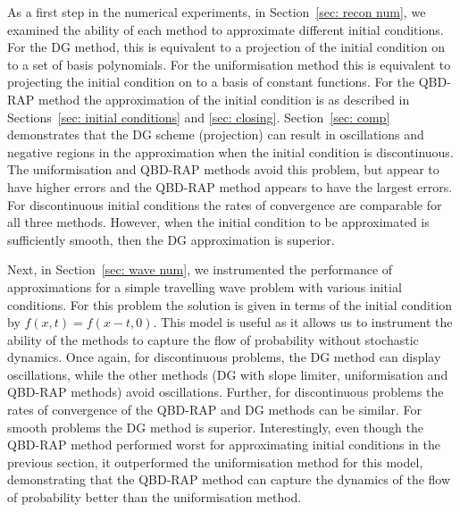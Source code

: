 As a first step in the numerical experiments, in Section~\ref{sec: recon num}, we examined the ability of each method to approximate different initial conditions. For the DG method, this is equivalent to a projection of the initial condition on to a set of basis polynomials. For the uniformisation method this is equivalent to projecting the initial condition on to a basis of constant functions. For the QBD-RAP method the approximation of the initial condition is as described in Sections~\ref{sec: initial conditions} and \ref{sec: closing}. Section~\ref{sec: comp} demonstrates that the DG scheme (projection) can result in oscillations and negative regions in the approximation when the initial condition is discontinuous. The uniformisation and QBD-RAP methods avoid this problem, but appear to have higher errors and the QBD-RAP method appears to have the largest errors. For discontinuous initial conditions the rates of convergence are comparable for all three methods. However, when the initial condition to be approximated is sufficiently smooth, then the DG approximation is superior. 

Next, in Section~\ref{sec: wave num}, we instrumented the performance of approximations for a simple travelling wave problem with various initial conditions. For this problem the solution is given in terms of the initial condition by \(f(x,t) = f(x-t,0)\). This model is useful as it allows us to instrument the ability of the methods to capture the flow of probability without stochastic dynamics. Once again, for discontinuous problems, the DG method can display oscillations, while the other methods (DG with slope limiter, uniformisation and QBD-RAP methods) avoid oscillations. Further, for discontinuous problems the rates of convergence of the QBD-RAP and DG methods can be similar. For smooth problems the DG method is superior. Interestingly, even though the QBD-RAP method performed worst for approximating initial conditions in the previous section, it outperformed the uniformisation method for this model, demonstrating that the QBD-RAP method can capture the dynamics of the flow of probability better than the uniformisation method.

